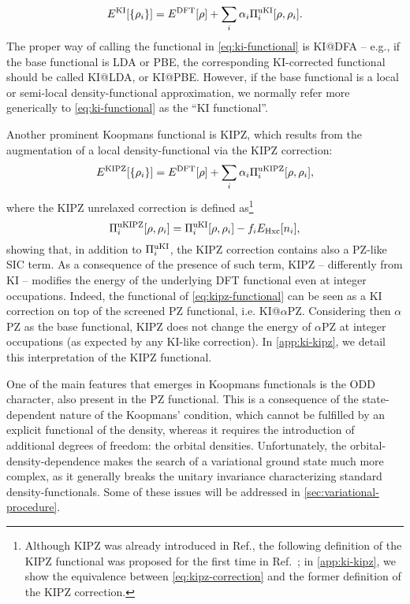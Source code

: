 %
\begin{equation}
    E^{\rm KI}[\{\rho_i\}] = E^{\rm DFT}[\rho] + \sum_i \alpha_i \Pi_i^{\rm uKI}[\rho, \rho_i] .
    \label{eq:ki-functional}
\end{equation}
%
The proper way of calling the functional in \cref{eq:ki-functional} is KI@DFA -- e.g., if the base functional is LDA or PBE, the corresponding KI-corrected functional should be called KI@LDA, or KI@PBE. However, if the base functional is a local or semi-local density-functional approximation, we normally refer more generically to \cref{eq:ki-functional} as the ``KI functional''.

Another prominent Koopmans functional is KIPZ, which results from the augmentation of a local density-functional via the KIPZ correction:
%
\begin{equation}
    E^{\rm KIPZ}[\{\rho_i\}] = E^{\rm DFT}[\rho] + \sum_i \alpha_i \Pi_i^{\rm uKIPZ}[\rho, \rho_i] ,
    \label{eq:kipz-functional}
\end{equation}
%
where the KIPZ unrelaxed correction is defined as\footnote{Although KIPZ was already introduced in Ref.\cite{borghi_koopmans-compliant_2014}, the following definition of the KIPZ functional was proposed for the first time in Ref.~\cite{borghi_variational_2015}; in \cref{app:ki-kipz}, we show the equivalence between \cref{eq:kipz-correction} and the former definition of the KIPZ correction.}
%
\begin{equation}
    \Pi_i^{\rm uKIPZ}[\rho,\rho_i] = \Pi_i^{\rm uKI}[\rho,\rho_i] - f_i E_{\rm Hxc}[n_i] ,
    \label{eq:kipz-correction}
\end{equation}
%
showing that, in addition to $\Pi_i^{\rm uKI}$, the KIPZ correction contains also a PZ-like SIC term. As a consequence of the presence of such term, KIPZ -- differently from KI -- modifies the energy of the underlying DFT functional even at integer occupations. Indeed, the functional of \cref{eq:kipz-functional} can be seen as a KI correction on top of the screened PZ functional, i.e. KI@$\alpha$PZ. Considering then $\alpha$PZ as the base functional, KIPZ does not change the energy of $\alpha$PZ at integer occupations (as expected by any KI-like correction). In \cref{app:ki-kipz}, we detail this interpretation of the KIPZ functional.

One of the main features that emerges in Koopmans functionals is the ODD character, also present in the PZ functional. This is a consequence of the state-dependent nature of the Koopmans' condition, which cannot be fulfilled by an explicit functional of the density, whereas it requires the introduction of additional degrees of freedom: the orbital densities. Unfortunately, the orbital-density-dependence makes the search of a variational ground state much more complex, as it generally breaks the unitary invariance characterizing standard density-functionals. Some of these issues will be addressed in \cref{sec:variational-procedure}.


